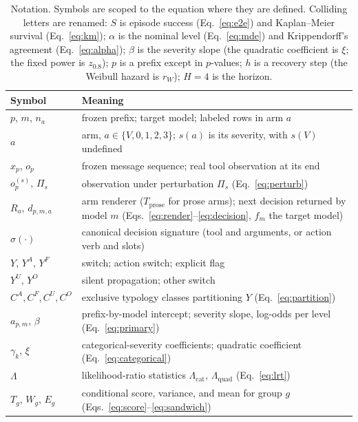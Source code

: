 \documentclass[a4paper,fleqn]{cas-sc}
\begin{document}
\begin{table}[pos=htbp]
  \centering
  \caption{Notation. Symbols are scoped to the equation where they are defined.
  Colliding letters are renamed: $S$ is episode success (Eq.~\ref{eq:e2e}) and
  Kaplan--Meier survival (Eq.~\ref{eq:km}); $\alpha$ is the nominal level
  (Eq.~\ref{eq:mde}) and Krippendorff's agreement (Eq.~\ref{eq:alpha}); $\beta$
  is the severity slope (the quadratic coefficient is $\xi$; the fixed power is
  $z_{0.8}$); $p$ is a prefix except in $p$-values; $h$ is a recovery step (the
  Weibull hazard is $r_W$); $H=4$ is the horizon.}
  \label{tab:notation}
  \small
  \begin{tabular}{>{\raggedright\arraybackslash}p{2.1cm}>{\raggedright\arraybackslash}p{11.6cm}}
    \toprule
    \textbf{Symbol} & \textbf{Meaning} \\
    \midrule
    $p$, $m$, $n_a$ & frozen prefix; target model; labeled rows in arm $a$ \\
    $a$ & arm, $a\in\{V,0,1,2,3\}$; $s(a)$ is its severity, with $s(V)$ undefined \\
    $x_p$, $o_p$ & frozen message sequence; real tool observation at its end \\
    $o_p^{(s)}$, $\Pi_s$ & observation under perturbation $\Pi_s$ (Eq.~\ref{eq:perturb}) \\
    $R_a$, $d_{p,m,a}$ & arm renderer ($T_{\mathrm{prose}}$ for prose arms); next decision returned by model $m$ (Eqs.~\ref{eq:render}--\ref{eq:decision}, $f_m$ the target model) \\
    $\sigma(\cdot)$ & canonical decision signature (tool and arguments, or action verb and slots) \\
    $Y$, $Y^{A}$, $Y^{F}$ & switch; action switch; explicit flag \\
    $Y^{U}$, $Y^{O}$ & silent propagation; other switch \\
    $C^{A},C^{F},C^{U},C^{O}$ & exclusive typology classes partitioning $Y$ (Eq.~\ref{eq:partition}) \\
    $a_{p,m}$, $\beta$ & prefix-by-model intercept; severity slope, log-odds per level (Eq.~\ref{eq:primary}) \\
    $\gamma_k$, $\xi$ & categorical-severity coefficients; quadratic coefficient (Eq.~\ref{eq:categorical}) \\
    $\Lambda$ & likelihood-ratio statistics $\Lambda_{\mathrm{cat}}$, $\Lambda_{\mathrm{quad}}$ (Eq.~\ref{eq:lrt}) \\
    $T_g$, $W_g$, $E_g$ & conditional score, variance, and mean for group $g$ (Eqs.~\ref{eq:score}--\ref{eq:sandwich}) \\

\end{tabular}
\end{table}
\end{document}
